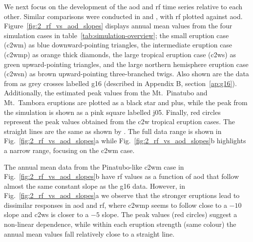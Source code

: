 \documentclass{ametsocV6.1}
\begin{document}
We next focus on the development of the \gls{aod} and \gls{rf} time series relative to
each other. Similar comparisons were conducted in \citet[][their Fig.\ 4]{gregory2016}
and \citet[][their Fig.\ 1]{marshall2020}, with \gls{rf} plotted against \gls{aod}.
Figure~\ref{fig:2_rf_vs_aod_slopes} displays annual mean values from the four simulation
cases in table~\ref{tab:simulation-overview}; the small eruption case (\gls{c2wm}) as
blue downward-pointing triangles, the intermediate eruption case (\gls{c2wmp}) as orange
thick diamonds, the large tropical eruption case (\gls{c2ws}) as green upward-pointing
triangles, and the large northern hemisphere eruption case (\gls{c2wsn}) as brown
upward-pointing three-branched twigs. Also shown are the data from \citet[][Fig.\ 4,
  black crosses from HadCM3 sstPiHistVol]{gregory2016} as grey crosses labelled \gls{g16}
(described in Appendix B, section~\ref{ap:g16}). Additionally, the estimated peak values
from the Mt.\ Pinatubo and Mt.\ Tambora eruptions are plotted as a black star and plus,
while the peak from the \citet{jones2005} simulation is shown as a pink square labelled
\gls{j05}. Finally, red circles represent the peak values obtained from the \gls{c2w}
tropical eruption cases. The straight lines are the same as shown by
\citet{gregory2016}. The full data range is shown in Fig.~\ref{fig:2_rf_vs_aod_slopes}a
while Fig.~\ref{fig:2_rf_vs_aod_slopes}b highlights a narrow range, focusing on the
\gls{c2wm} case.

The annual mean data from the Pinatubo-like \gls{c2wm} case in
Fig.~\ref{fig:2_rf_vs_aod_slopes}b have \gls{rf} values as a function of \gls{aod} that
follow almost the same constant slope as the \gls{g16} data. However, in
Fig.~\ref{fig:2_rf_vs_aod_slopes}a we observe that the stronger eruptions lead to
dissimilar responses in \gls{aod} and \gls{rf}, where \gls{c2wmp} seems to follow close
to a \(-10\) slope and \gls{c2ws} is closer to a \(-5\) slope.
The peak values (red circles) suggest a non-linear dependence, while within each
eruption strength (same colour) the annual mean values fall relatively close to a
straight line.
\end{document}
